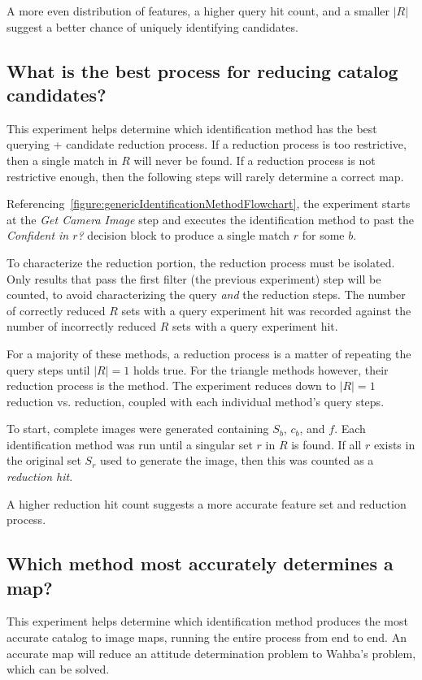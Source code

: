 A more even distribution of features, a higher query hit count, and a smaller $|R|$ suggest a better chance of uniquely
identifying candidates.

\subsection{What is the best process for reducing catalog candidates?}\label{subsec:candidateReductionMethods}
This experiment helps determine which identification method has the best querying + candidate reduction process.
If a reduction process is too restrictive, then a single match in $R$ will never be found.
If a reduction process is not restrictive enough, then the following steps will rarely determine a correct map.

Referencing~\autoref{figure:genericIdentificationMethodFlowchart}, the experiment starts at the \textit{Get Camera
Image} step and executes the identification method to past the \textit{Confident in $r$?} decision block to produce a
single match $r$ for some $b$.

To characterize the reduction portion, the reduction process must be isolated.
Only results that pass the first filter (the previous experiment) step will be counted, to avoid characterizing the
query \textit{and} the reduction steps.
The number of correctly reduced $R$ sets with a query experiment hit was recorded against the number of incorrectly
reduced $R$ sets with a query experiment hit.

For a majority of these methods, a reduction process is a matter of repeating the query steps until $|R|=1$ holds true.
For the triangle methods however, their reduction process is the  method.
The experiment reduces down to $|R|=1$ reduction vs.  reduction, coupled with each individual method's
query steps.

To start, complete images were generated containing $S_b$, $c_b$, and $f$.
Each identification method was run until a singular set $r$ in $R$ is found.
If all $r$ exists in the original set $S_r$ used to generate the image, then this was counted as a
\textit{reduction hit}.

A higher reduction hit count suggests a more accurate feature set and reduction process.

\subsection{Which method most accurately determines a map?}\label{subsec:identificationMethods}
This experiment helps determine which identification method produces the most accurate catalog to image maps, running
the entire process from end to end.
An accurate map will reduce an attitude determination problem to Wahba's problem, which can be solved.

